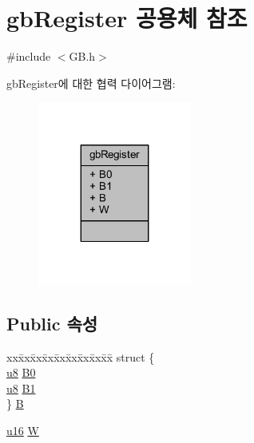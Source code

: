 \hypertarget{uniongb_register}{}\section{gb\+Register 공용체 참조}
\label{uniongb_register}


{\ttfamily \#include $<$G\+B.\+h$>$}



gb\+Register에 대한 협력 다이어그램\+:\nopagebreak
\begin{figure}[H]
\begin{center}
\leavevmode
\includegraphics[width=143pt]{uniongb_register__coll__graph}
\end{center}
\end{figure}
\subsection*{Public 속성}
\begin{DoxyCompactItemize}
\item 
\begin{tabbing}
xx\=xx\=xx\=xx\=xx\=xx\=xx\=xx\=xx\=\kill
struct \{\\
\>\mbox{\hyperlink{_system_8h_aed742c436da53c1080638ce6ef7d13de}{u8}} \mbox{\hyperlink{uniongb_register_a33d5b51c075ca4181cc1e72211f3a131}{B0}}\\
\>\mbox{\hyperlink{_system_8h_aed742c436da53c1080638ce6ef7d13de}{u8}} \mbox{\hyperlink{uniongb_register_afcb77cfe78f40d8fd1eccfa75f679867}{B1}}\\
\} \mbox{\hyperlink{uniongb_register_a038dba01c9bc9f3d72a2d49094319cb5}{B}}\\

\end{tabbing}\item 
\mbox{\hyperlink{_system_8h_a9e6c91d77e24643b888dbd1a1a590054}{u16}} \mbox{\hyperlink{uniongb_register_ab3d596e48605bc14793ff0292e6ed814}{W}}
\end{DoxyCompactItemize}


